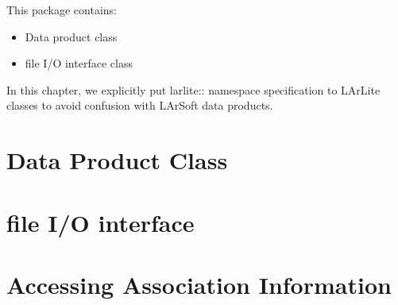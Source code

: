
This package contains:
\begin{itemize}
\item Data product class
\item \ROOT file I/O interface class
\end{itemize}
In this chapter, we explicitly put {\ttfamily larlite::} namespace specification to LArLite classes to avoid confusion with LArSoft data products.

\section{Data Product Class}
\label{sec:dataproduct}


\section{\ROOT file I/O interface}
\label{sec:io}


\section{Accessing Association Information}
\label{sec:association_howto}

